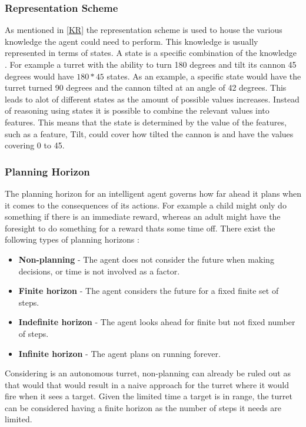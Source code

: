 \subsubsection{Representation Scheme}
As mentioned in \autoref{KR} the representation scheme is used to house the
various knowledge the agent could need to perform. This knowledge is usually
represented in terms of states. A state is a specific combination of
the knowledge \citep[Ch 1.5.2]{MIBook}. For example a turret with the ability
to turn 180 degrees and tilt its cannon 45 degrees would have $180 * 45$ states. As an example, a
specific state would have the turret turned 90 degrees and the cannon tilted at an angle of 42
degrees. This leads to alot of different states as the amount of possible values
increases. Instead of reasoning using states it is possible to combine the
relevant values into features. This means that the state is determined by the
value of the features, such as a feature, Tilt, could cover how tilted the
cannon is and have the values covering 0 to 45.

\subsubsection{Planning Horizon}
The planning horizon for an intelligent agent governs how far ahead it plans
when it comes to the consequences of its actions. For example a child might
only do something if there is an immediate reward, whereas an adult might have
the foresight to do something for a reward thats some time off. There exist the
following types of planning horizons \citep[Ch 1.5.3]{MIBook}:
\begin{itemize}
	\item \textbf{Non-planning} - The agent does not consider the future when
	making decisions, or time is not involved as a factor.
	\item \textbf{Finite horizon} - The agent considers the future for a fixed
	finite set of steps. 
	\item \textbf{Indefinite horizon} - The agent looks ahead for finite but not
	fixed number of steps.
	\item \textbf{Infinite horizon} - The agent plans on running forever.	
\end{itemize}

Considering \name is an autonomous turret, non-planning can already be ruled
out as that would that would result in a naive approach for the turret where it
would fire when it sees a target. Given the limited time a target is in range,
the turret can be considered having a finite horizon as the number of steps it
needs are limited.

